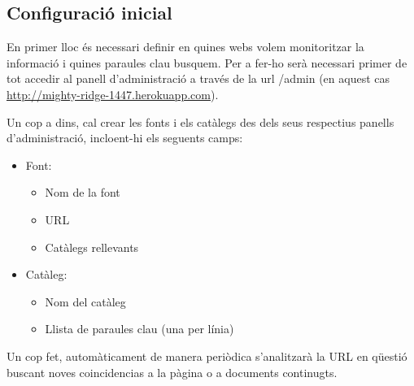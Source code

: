 \documentclass{article}
\begin{document}
\subsection{Configuració inicial}

En primer lloc és necessari definir en quines webs volem monitoritzar la informació i quines paraules clau busquem. Per a fer-ho serà necessari primer de tot accedir al panell d'administració a través de la url /admin (en aquest cas \url{http://mighty-ridge-1447.herokuapp.com}).

Un cop a dins, cal crear les fonts i els catàlegs des dels seus respectius panells d'administració, incloent-hi els seguents camps:

\begin{itemize}
    \item Font:
    \begin{itemize}
        \item Nom de la font
        \item URL
        \item Catàlegs rellevants
    \end{itemize}
    \item Catàleg:
    \begin{itemize}
        \item Nom del catàleg
        \item Llista de paraules clau (una per línia)
    \end{itemize}
\end{itemize}

Un cop fet, automàticament de manera periòdica s'analitzarà la URL en qüestió buscant noves coincidencias a la pàgina o a documents continugts.


\newpage
\end{document}
